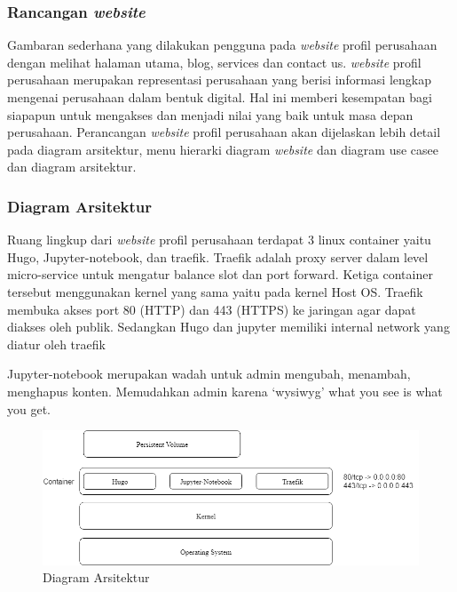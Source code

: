 \subsubsection{Rancangan \emph{website}}
Gambaran sederhana yang dilakukan pengguna pada \emph{website} profil perusahaan dengan melihat halaman utama, 
blog, services dan contact us. \emph{website} profil perusahaan merupakan representasi 
perusahaan yang berisi informasi lengkap mengenai perusahaan dalam bentuk digital. 
Hal ini  memberi kesempatan bagi siapapun untuk mengakses dan menjadi nilai yang baik untuk masa depan perusahaan. 
Perancangan \emph{website} profil perusahaan akan dijelaskan lebih detail pada diagram arsitektur, 
menu hierarki diagram \emph{website} dan diagram use casee dan diagram arsitektur.

\subsubsection{Diagram Arsitektur}
Ruang lingkup dari \emph{website} profil perusahaan terdapat 3 linux container yaitu Hugo, 
Jupyter-notebook, dan traefik.  Traefik adalah proxy server dalam level micro-service 
untuk mengatur balance slot dan port forward. Ketiga container tersebut menggunakan kernel 
yang sama yaitu pada kernel Host OS. Traefik membuka akses port 80 (HTTP) dan 443 (HTTPS) ke 
jaringan agar dapat diakses oleh publik. Sedangkan Hugo dan jupyter memiliki internal network  
yang diatur oleh traefik 

Jupyter-notebook merupakan wadah untuk admin mengubah, menambah, menghapus konten. 
Memudahkan admin karena ‘wysiwyg’ what you see is what you get.\\

\begin{figure}[htbp]
    \begin{center}
    \includegraphics[width=15cm]{img/diag-arsitektur.png}
    \caption{Diagram Arsitektur}
    \label{gambar:diag-arsitektur}
    \end{center}
\end{figure}

